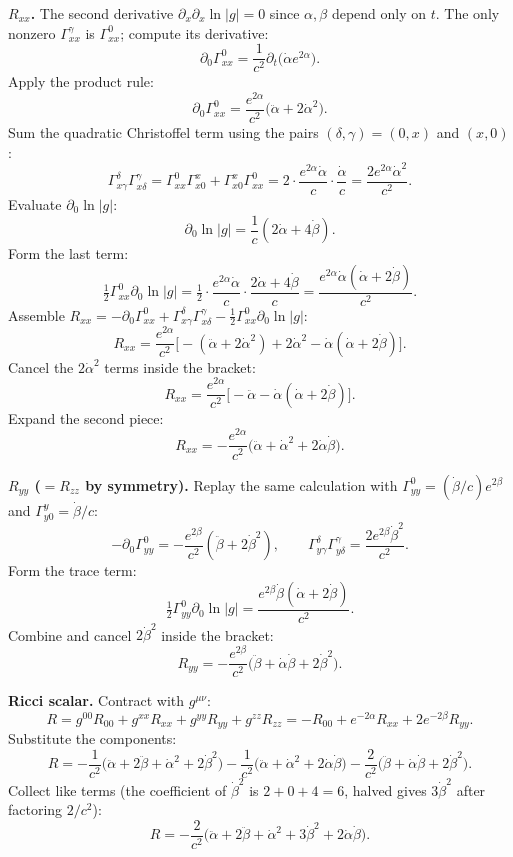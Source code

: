 \documentclass[11pt]{article}
\begin{document}
\textbf{$R_{xx}$.} The second derivative $\partial_x\partial_x\ln|g|=0$ since $\alpha,\beta$ depend only on $t$. The only nonzero $\Gamma^\gamma_{xx}$ is $\Gamma^0_{xx}$; compute its derivative:
\[
\partial_0\Gamma^0_{xx}=\frac{1}{c^2}\partial_t\bigl(\dot\alpha e^{2\alpha}\bigr).
\]
Apply the product rule:
\[
\partial_0\Gamma^0_{xx}=\frac{e^{2\alpha}}{c^2}\bigl(\ddot\alpha+2\dot\alpha^2\bigr).
\]
Sum the quadratic Christoffel term using the pairs $(\delta,\gamma)=(0,x)$ and $(x,0)$:
\[
\Gamma^\delta_{x\gamma}\Gamma^\gamma_{x\delta}=\Gamma^0_{xx}\Gamma^x_{x0}+\Gamma^x_{x0}\Gamma^0_{xx}=2\cdot\frac{e^{2\alpha}\dot\alpha}{c}\cdot\frac{\dot\alpha}{c}=\frac{2e^{2\alpha}\dot\alpha^2}{c^2}.
\]
Evaluate $\partial_0\ln|g|$:
\[
\partial_0\ln|g|=\frac{1}{c}(2\dot\alpha+4\dot\beta).
\]
Form the last term:
\[
\tfrac12\Gamma^0_{xx}\partial_0\ln|g|=\tfrac12\cdot\frac{e^{2\alpha}\dot\alpha}{c}\cdot\frac{2\dot\alpha+4\dot\beta}{c}=\frac{e^{2\alpha}\dot\alpha(\dot\alpha+2\dot\beta)}{c^2}.
\]
Assemble $R_{xx}=-\partial_0\Gamma^0_{xx}+\Gamma^\delta_{x\gamma}\Gamma^\gamma_{x\delta}-\tfrac12\Gamma^0_{xx}\partial_0\ln|g|$:
\[
R_{xx}=\frac{e^{2\alpha}}{c^2}\bigl[-(\ddot\alpha+2\dot\alpha^2)+2\dot\alpha^2-\dot\alpha(\dot\alpha+2\dot\beta)\bigr].
\]
Cancel the $2\dot\alpha^2$ terms inside the bracket:
\[
R_{xx}=\frac{e^{2\alpha}}{c^2}\bigl[-\ddot\alpha-\dot\alpha(\dot\alpha+2\dot\beta)\bigr].
\]
Expand the second piece:
\[
R_{xx}=-\frac{e^{2\alpha}}{c^2}\bigl(\ddot\alpha+\dot\alpha^2+2\dot\alpha\dot\beta\bigr).
\]

\textbf{$R_{yy}$ ($=R_{zz}$ by symmetry).} Replay the same calculation with $\Gamma^0_{yy}=(\dot\beta/c)e^{2\beta}$ and $\Gamma^y_{y0}=\dot\beta/c$:
\[
-\partial_0\Gamma^0_{yy}=-\frac{e^{2\beta}}{c^2}(\ddot\beta+2\dot\beta^2),\qquad \Gamma^\delta_{y\gamma}\Gamma^\gamma_{y\delta}=\frac{2e^{2\beta}\dot\beta^2}{c^2}.
\]
Form the trace term:
\[
\tfrac12\Gamma^0_{yy}\partial_0\ln|g|=\frac{e^{2\beta}\dot\beta(\dot\alpha+2\dot\beta)}{c^2}.
\]
Combine and cancel $2\dot\beta^2$ inside the bracket:
\[
R_{yy}=-\frac{e^{2\beta}}{c^2}\bigl(\ddot\beta+\dot\alpha\dot\beta+2\dot\beta^2\bigr).
\]

\textbf{Ricci scalar.} Contract with $g^{\mu\nu}$:
\[
R=g^{00}R_{00}+g^{xx}R_{xx}+g^{yy}R_{yy}+g^{zz}R_{zz}=-R_{00}+e^{-2\alpha}R_{xx}+2e^{-2\beta}R_{yy}.
\]
Substitute the components:
\[
R=-\frac{1}{c^2}\bigl(\ddot\alpha+2\ddot\beta+\dot\alpha^2+2\dot\beta^2\bigr)-\frac{1}{c^2}\bigl(\ddot\alpha+\dot\alpha^2+2\dot\alpha\dot\beta\bigr)-\frac{2}{c^2}\bigl(\ddot\beta+\dot\alpha\dot\beta+2\dot\beta^2\bigr).
\]
Collect like terms (the coefficient of $\dot\beta^2$ is $2+0+4=6$, halved gives $3\dot\beta^2$ after factoring $2/c^2$):
\[
R=-\frac{2}{c^2}\bigl(\ddot\alpha+2\ddot\beta+\dot\alpha^2+3\dot\beta^2+2\dot\alpha\dot\beta\bigr).
\]
\end{document}
